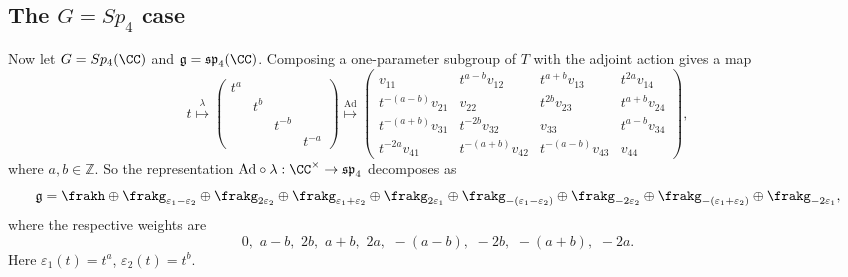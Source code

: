 \subsection{The $G = Sp_4$ case}
Now let $G = Sp_4(\CC)$ and $\mathfrak{g} = \mathfrak{sp}_4(\CC)$.
Composing a one-parameter subgroup of $T$ with the adjoint action gives a map
$$t 
\overset{\lambda}{\mapsto} 
\begin{pmatrix} 
	t^a & & & \\ 
	& t^b & & \\ 
	& & t^{-b} & \\
	& & & t^{-a} 
\end{pmatrix}
\overset{\mathrm{Ad}}{\mapsto} 
\begin{pmatrix} 
	v_{11} & t^{a-b} v_{12} & t^{a+b} v_{13} & t^{2a} v_{14} \\ 
	t^{-(a-b)} v_{21} & v_{22} & t^{2b} v_{23} & t^{a+b} v_{24} \\ 
	t^{-(a+b)} v_{31} & t^{-2b} v_{32} & v_{33} & t^{a-b} v_{34} \\
	t^{-2a} v_{41} & t^{-(a+b)} v_{42} & t^{-(a-b)} v_{43} & v_{44}
\end{pmatrix},$$
where $a, b \in \mathbb{Z}$.
So the representation $\mathrm{Ad} \circ \lambda : \CC^\times \to \mathfrak{sp}_4$ decomposes as
$$
\mathfrak{g} 
= \frakh \oplus \frakg_{\varepsilon_1-\varepsilon_2} \oplus \frakg_{2 \varepsilon_2} \oplus \frakg_{\varepsilon_1+\varepsilon_2} \oplus \frakg_{2\varepsilon_1} 
\oplus \frakg_{-(\varepsilon_1-\varepsilon_2)} \oplus \frakg_{-2 \varepsilon_2} \oplus \frakg_{-(\varepsilon_1+\varepsilon_2)} \oplus \frakg_{-2\varepsilon_1}, 
$$
where the respective weights are
$$0, \,\, a-b, \,\, 2b, \,\, a+b, \,\, 2a, \,\, -(a-b), \,\, -2b, \,\, -(a+b), \,\, -2a.$$
Here $\varepsilon_1(t) = t^{a}$, $\varepsilon_2(t) = t^{b}$.

